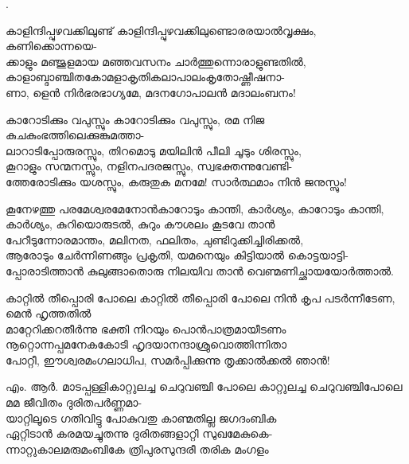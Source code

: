 \begin{enumerate}

.


\begin{slokam}{\VSv}{\VKG}{കാളിന്ദിപ്പുഴവക്കിലുണ്ട്}
കാളിന്ദിപ്പുഴവക്കിലുണ്ടൊരരയാൽവൃക്ഷം, കണിക്കൊന്നയെ-\\
ക്കാളും മഞ്ജുളമായ മഞ്ഞവസനം ചാർത്തുന്നൊരാളുണ്ടതിൽ,\\
കാളാബ്ദാഞ്ചിതകോമളാകൃതികലാപാലംകൃതോഷ്ണീഷനാ-\\
ണാ, ളെൻ നിർഭരഭാഗ്യമേ, മദനഗോപാലൻ മദാലംബനം!
\end{slokam}



\begin{slokam}{\VSr}{\VKG}{കാറോടിക്കും വപുസ്സും}
കാറോടിക്കും വപുസ്സും, രമ നിജ കുചകുംഭത്തിലെക്കുങ്കുമത്താ-\\
ലാറാടിപ്പോരുരസ്സും, തിറമൊടു മയിലിൻ പീലി ചൂടും ശിരസ്സും,\\
കൂറാളും സന്മനസ്സും, നളിനപദരജസ്സും, സ്വഭക്തന്നുവേണ്ടി-\\
ത്തേരോടിക്കും യശസ്സും, കരുതുക മനമേ! സാർത്ഥമാം നിൻ ജനുസ്സും!
\end{slokam}


\begin{slokam}{\VSr}{കൂനേഴത്തു പരമേശ്വരമേനോൻ}{കാറോടും കാന്തി, കാർശ്യം,}
കാറോടും കാന്തി, കാർശ്യം, കുറിയൊരുടൽ, കുറും കൗശലം കൂടവേ താൻ\\
പേറീടുന്നോരമാന്തം, മലിനത, ഫലിതം, ചുണ്ടിറുക്കിച്ചിരിക്കൽ, \\
ആരോടും ചേർന്നിണങ്ങും പ്രകൃതി, യമനെയും കിട്ടിയാൽ കൊട്ടയാട്ടി-\\
പ്പോരാടിത്താൻ കുലുങ്ങാതൊരു നിലയിവ താൻ വെണ്മണിച്ഛായയോർത്താൽ. 
\end{slokam}



\begin{slokam}{\VSv}{\UN}{കാറ്റിൽ തീപ്പൊരി പോലെ}
കാറ്റിൽ തീപ്പൊരി പോലെ നിൻ കൃപ പടർന്നീടേണ, മെൻ ഹൃത്തതിൽ\\
മാറ്റേറിക്കറതീർന്നു ഭക്തി നിറയും പൊൻപാത്രമായീടണം\\
നൂറ്റൊന്നപ്പമനേകകോടി ഹൃദയാനന്ദാശ്രുവൊത്തിന്നിതാ\\
പോറ്റീ, ഈശ്വരമംഗലാധിപ, സമർപ്പിക്കുന്നു തൃക്കാൽക്കൽ ഞാൻ!
\end{slokam}



\begin{slokam}{\VKm}{എം. ആർ. മാടപ്പള്ളി}{കാറ്റുലച്ച ചെറുവഞ്ചി പോലെ}
കാറ്റുലച്ച ചെറുവഞ്ചിപോലെ മമ ജീവിതം ദുരിതപർണ്ണമാ-\\
യാറ്റിലൂടെ ഗതിവിട്ടു പോകുവതു കാണ്മതില്ല ജഗദംബിക\\ 
ഏറ്റിടാൻ കരമയച്ചുതന്നു ദുരിതങ്ങളാറ്റി സുഖമേകുകെ-\\
ന്നാറ്റുകാലമരുമംബികേ ത്രിപുരസുന്ദരീ തരിക മംഗളം
\end{slokam}


\end{enumerate}
